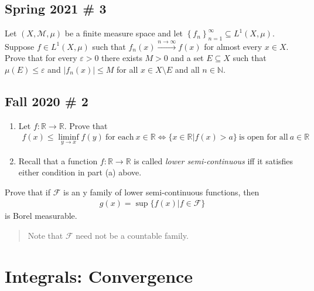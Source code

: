 \hypertarget{spring-2021-3}{%
\subsection{Spring 2021 \# 3}\label{spring-2021-3}}

Let \((X, \mathcal{M}, \mu)\) be a finite measure space and let
\(\left\{{ f_n}\right\}_{n=1}^{\infty } \subseteq L^1(X, \mu)\). Suppose
\(f\in L^1(X, \mu)\) such that \(f_n(x) \overset{n\to \infty }\to f(x)\)
for almost every \(x \in X\). Prove that for every \(\varepsilon> 0\)
there exists \(M>0\) and a set \(E\subseteq X\) such that
\(\mu(E) \leq \varepsilon\) and
\({\left\lvert {f_n(x)} \right\rvert}\leq M\) for all
\(x\in X\setminus E\) and all \(n\in {\mathbb{N}}\).

\hypertarget{fall-2020-2}{%
\subsection{Fall 2020 \# 2}\label{fall-2020-2}}

\begin{enumerate}
\def\labelenumi{\alph{enumi}.}
\item
  Let \(f: {\mathbb{R}}\to {\mathbb{R}}\). Prove that
  \begin{align*}
  f(x) \leq \liminf_{y\to x} f(y)~ \text{for each}~ x\in {{\mathbb{R}}} \iff \{ x\in {{\mathbb{R}}} \mathrel{\Big|}f(x) > a \}~\text{is open for all}~ a\in {{\mathbb{R}}}
  \end{align*}
\item
  Recall that a function \(f: {{\mathbb{R}}} \to {{\mathbb{R}}}\) is
  called \emph{lower semi-continuous} iff it satisfies either condition
  in part (a) above.
\end{enumerate}

Prove that if \(\mathcal{F}\) is an y family of lower semi-continuous
functions, then
\begin{align*}
g(x) = \sup\{ f(x) \mathrel{\Big|}f\in \mathcal{F}\}
\end{align*}
is Borel measurable.

\begin{quote}
Note that \(\mathcal{F}\) need not be a countable family.
\end{quote}

\hypertarget{integrals-convergence}{%
\section{Integrals: Convergence}\label{integrals-convergence}}

